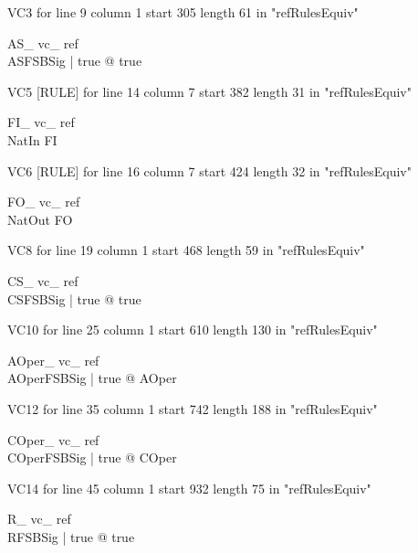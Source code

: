 \documentclass{article}
\begin{document}
VC3 for line 9 column 1 start 305 length 61 in "refRulesEquiv"
\begin{theorem}{ AS\_ vc\_ ref}\\
 \exists ASFSBSig | true @ true \\

\end{theorem}

VC5 [RULE] for line 14 column 7 start 382 length 31 in "refRulesEquiv"
\begin{theorem}{ FI\_ vc\_ ref}\\
 NatIn \in \nat \inj FI \\

\end{theorem}

VC6 [RULE] for line 16 column 7 start 424 length 32 in "refRulesEquiv"
\begin{theorem}{ FO\_ vc\_ ref}\\
 NatOut \in \nat \inj FO \\

\end{theorem}

VC8 for line 19 column 1 start 468 length 59 in "refRulesEquiv"
\begin{theorem}{ CS\_ vc\_ ref}\\
 \exists CSFSBSig | true @ true \\

\end{theorem}

VC10 for line 25 column 1 start 610 length 130 in "refRulesEquiv"
\begin{theorem}{ AOper\_ vc\_ ref}\\
 \forall AOperFSBSig | true @ \pre AOper \\

\end{theorem}

VC12 for line 35 column 1 start 742 length 188 in "refRulesEquiv"
\begin{theorem}{ COper\_ vc\_ ref}\\
 \forall COperFSBSig | true @ \pre COper \\

\end{theorem}

VC14 for line 45 column 1 start 932 length 75 in "refRulesEquiv"
\begin{theorem}{ R\_ vc\_ ref}\\
 \exists RFSBSig | true @ true \\

\end{theorem}
\end{document}
